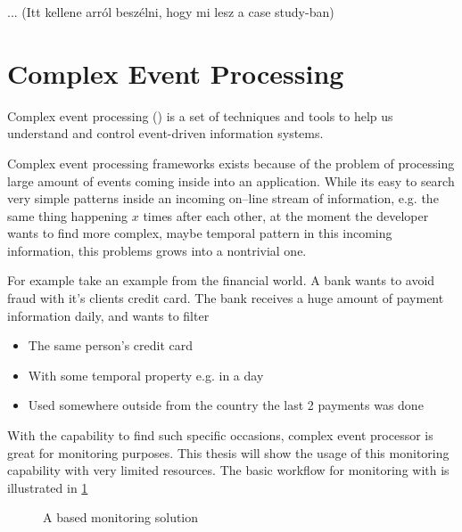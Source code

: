 ... (Itt kellene arról beszélni, hogy mi lesz a case study-ban)

\section{Complex Event Processing}

Complex event processing (\cep) is a set of techniques and tools to help us understand and control event-driven information systems.\citep{Luckham:2001:PEI:515781}

Complex event processing frameworks exists because of the problem of processing large amount of events coming inside into an application. While its easy to search  very simple patterns inside an incoming on--line stream of information, e.g. the same thing happening $x$ times after each other, at the moment the developer wants to find more complex, maybe temporal pattern in this incoming information, this problems grows into a nontrivial one.

For example take an example from the financial world. A bank wants to avoid fraud with it's clients credit card. The bank receives a huge amount of payment information daily, and wants to filter
\begin{itemize}
	\item The same person's credit card
	\item With some temporal property e.g. in a day
	\item Used somewhere outside from the country the last 2 payments was done
\end{itemize}

With the capability to find such specific occasions, complex event processor is great for monitoring purposes. This thesis will show the usage of this monitoring capability with very limited resources. The basic workflow for monitoring with \cep is illustrated in \cref{fig:cep_monitoring}

\begin{figure}[!h]
	\centering
	\caption{A \cep based monitoring solution}
	\label{fig:cep_monitoring}
\end{figure}

